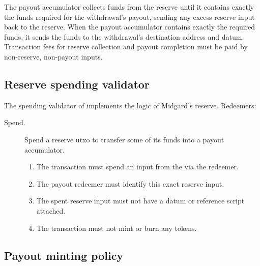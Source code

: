 \documentclass[../midgard.tex]{subfiles}
\begin{document}
The payout accumulator collects funds from the reserve until it contains exactly the funds required for the withdrawal's payout, sending any excess reserve input back to the reserve.
When the payout accumulator contains exactly the required funds, it sends the funds to the withdrawal's destination address and datum.
Transaction fees for reserve collection and payout completion must be paid by non-reserve, non-payout inputs.

\subsection{Reserve spending validator}%
\label{h:reserve-spending-validator}%

The spending validator of  implements the logic of Midgard's reserve.
Redeemers:
\begin{description}
  \item[Spend.] Spend a reserve utxo to transfer some of its funds into a payout accumulator.
    \begin{enumerate}
      \item The transaction must spend an input from the  via the  redeemer.
      \item The payout redeemer must identify this exact reserve input.
      \item The spent reserve input must not have a datum or reference script attached.
      \item The transaction must not mint or burn any tokens.
    \end{enumerate}
\end{description}

\subsection{Payout minting policy}%
\label{h:payout-minting-policy}%
\end{document}
